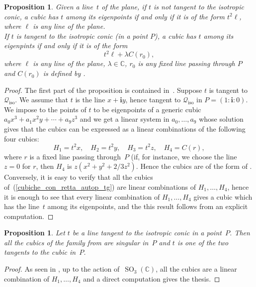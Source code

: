 \documentclass{amsart}
\theoremstyle{plain}
\newtheorem{prop}[lemma]{Proposition}
\theoremstyle{definition}
\newcommand{\C}{\mathbb{C}}
\newcommand{\iso}{\mathcal{Q}_{\mathrm{iso}}}
\newcommand{\SO}{\operatorname{SO}}
\newcommand{\iii}{\textbf{i}}
\begin{document}
\begin{prop}
\label{prop:eigenline_non_tangent}
Given a line~$t$ of the plane, if $t$ is not tangent to the 
isotropic conic, a cubic has $t$ among its eigenpoints if and 
only if it is of the form $t^2\ell$, where $\ell$ is any line of the 
plane. \\ 
If $t$ is tangent to the isotropic conic (in a point $P$), a cubic has $t$ 
among its eigenpints if and only if it is of the form
\begin{equation}
\label{cubiche_con_retta_autop_tg}
  t^2 \ell+\lambda C(r_0),
\end{equation}
%
where $\ell$ is any line of the plane, $\lambda \in \C$, 
$r_0$ is any fixed line passing through $P$ and $C(r_0)$ is
defined by . 
\end{prop}
\begin{proof}
The first part of the proposition is contained in~.
Suppose $t$ is tangent to $\iso$. We assume that $t$ is the line
$x+\iii y$, hence tangent to $\iso$ in $P = (1: \iii: 0)$.
We impose to the points
of $t$ to be eigenpoints of a generic cubic $a_0x^3+a_1x^2y+\cdots+a_9z^3$
and we get a linear system in $a_0, \dots, a_9$ whose solution gives that
the cubics can be expressed as a linear combinations of the following
four cubics:
%
\[
  H_1 = t^2x, \quad
  H_2 = t^2y, \quad
  H_3 = t^2z, \quad
  H_4 = C(r),
\]
%
where $r$ is a fixed line passing through~$P$ (if, for instance, 
we choose the line $z=0$ for $r$, 
then $H_4$ is $z(x^2 + y^2 + 2/3z^2)$. Hence the cubics are of the
form of . Conversely, it is easy to verify
that all the cubics of~(\ref{cubiche_con_retta_autop_tg}) are
linear combinations of $H_1, \dots, H_4$, hence it is enough
to see that every linear combination of $H_1, \dots, H_4$ gives a
cubic which has the line~$t$ among its eigenpoints, and the this result follows from an explicit computation.
\end{proof}

\begin{prop}
Let $t$ be a line tangent to the isotropic conic in a point~$P$.
Then all the cubics of the family from  are singular in~$P$ and $t$ is one of the two tangents to the cubic in~$P$.
\end{prop}
\begin{proof}
As seen in , up to the action of~$\SO_3(\C)$, all the
cubics are a linear combination of $H_1, \dots, H_4$ and a direct
computation gives the thesis.
\end{proof}
\end{document}
